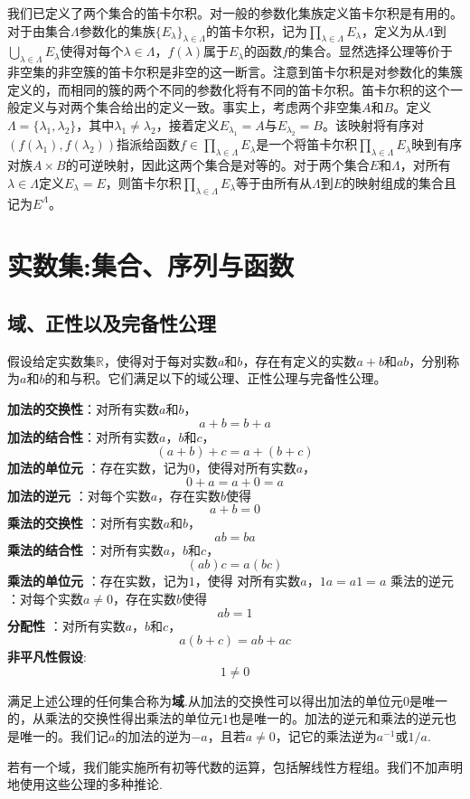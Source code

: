 \documentclass[lang=cn,newtx,10pt,scheme=chinese]{../Template/elegantbook}
\begin{document}
我们已定义了两个集合的笛卡尔积。对一般的参数化集族定义笛卡尔积是有用的。对于由集合\(\Lambda\)参数化的集族\(\{E_{\lambda}\}_{\lambda\in\Lambda}\)的笛卡尔积，记为\(\prod_{\lambda\in\Lambda}E_{\lambda}\)，定义为从\(\Lambda\)到\(\bigcup_{\lambda\in\Lambda}E_{\lambda}\)使得对每个\(\lambda\in\Lambda\)，\(f(\lambda)\)属于\(E_{\lambda}\)的函数\(f\)的集合。显然选择公理等价于非空集的非空簇的笛卡尔积是非空的这一断言。注意到笛卡尔积是对参数化的集簇定义的，而相同的簇的两个不同的参数化将有不同的笛卡尔积。笛卡尔积的这个一般定义与对两个集合给出的定义一致。事实上，考虑两个非空集\(A\)和\(B\)。定义\(\Lambda=\{\lambda_1,\lambda_2\}\)，其中\(\lambda_1\neq\lambda_2\)，接着定义\(E_{\lambda_1}=A\)与\(E_{\lambda_2}=B\)。该映射将有序对\((f(\lambda_1),f(\lambda_2))\)指派给函数\(f\in\prod_{\lambda\in\Lambda}E_{\lambda}\)是一个将笛卡尔积\(\prod_{\lambda\in\Lambda}E_{\lambda}\)映到有序对族\(A\times B\)的可逆映射，因此这两个集合是对等的。对于两个集合\(E\)和\(\Lambda\)，对所有\(\lambda\in\Lambda\)定义\(E_{\lambda}=E\)，则笛卡尔积\(\prod_{\lambda\in\Lambda}E_{\lambda}\)等于由所有从\(\Lambda\)到\(E\)的映射组成的集合且记为\(E^{\Lambda}\)。







\chapter{实数集:集合、序列与函数}

\section{域、正性以及完备性公理}

假设给定实数集\(\mathbb{R}\)，使得对于每对实数\(a\)和\(b\)，存在有定义的实数\(a + b\)和\(ab\)，分别称为\(a\)和\(b\)的和与积。它们满足以下的域公理、正性公理与完备性公理。

\begin{axiom}[域公理]\label{axiom:域公理}
  \textbf{加法的交换性}：对所有实数\(a\)和\(b\)，
\[a + b = b + a\]
\textbf{加法的结合性}：对所有实数\(a\)，\(b\)和\(c\)，
\[(a + b)+c = a+(b + c)\]
\textbf{加法的单位元} ：存在实数，记为\(0\)，使得对所有实数\(a\)，
\[0 + a = a + 0 = a\]
\textbf{加法的逆元} ：对每个实数\(a\)，存在实数\(b\)使得
\[a + b = 0\]
\textbf{乘法的交换性} ：对所有实数\(a\)和\(b\)，
\[ab = ba\]
\textbf{乘法的结合性} ：对所有实数\(a\)，\(b\)和\(c\)，
\[(ab)c = a(bc)\]
\textbf{乘法的单位元} ：存在实数，记为\(1\)，使得
对所有实数\(a\)，\(1a = a1 = a\)
 乘法的逆元 ：对每个实数\(a\neq0\)，存在实数\(b\)使得
\[ab = 1\]
\textbf{分配性} ：对所有实数\(a\)，\(b\)和\(c\)，
\[a(b + c)=ab + ac\]
\textbf{非平凡性假设}:
\[1\neq0\]

满足上述公理的任何集合称为\textbf{域}.从加法的交换性可以得出加法的单位元\(0\)是唯一的，从乘法的交换性得出乘法的单位元\(1\)也是唯一的。加法的逆元和乘法的逆元也是唯一的。我们记\(a\)的加法的逆为\(-a\)，且若\(a\neq0\)，记它的乘法逆为\(a^{-1}\)或\(1/a\).
\end{axiom}
\begin{remark}
  若有一个域，我们能实施所有初等代数的运算，包括解线性方程组。我们不加声明地使用这些公理的多种推论.
\end{remark}
\end{document}
